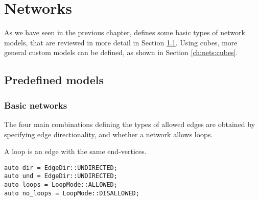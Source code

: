 \chapter{Networks} \label{ch:networks}

As we have seen in the previous chapter,  defines some basic types of network models, that are reviewed in more detail in Section \ref{ch:nets:basic}. Using cubes, more general custom models can be defined, as shown in Section \ref{ch:nets:cubes}.

\section{Predefined models} \label{ch:nets:basic}

\subsection{Basic networks}

The four main combinations defining the types of allowed edges are obtained by specifying edge directionality, and whether a network allows loops.

\begin{definition}[Loop]
A loop is an edge with the same end-vertices. 
\end{definition}

\begin{lstlisting}[style=c++]
auto dir = EdgeDir::UNDIRECTED;
auto und = EdgeDir::UNDIRECTED;
auto loops = LoopMode::ALLOWED;
auto no_loops = LoopMode::DISALLOWED;
\end{lstlisting}
    
